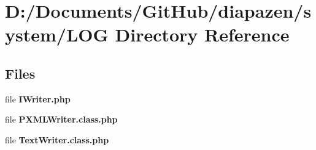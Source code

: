 \section{D\-:/\-Documents/\-Git\-Hub/diapazen/system/\-L\-O\-G Directory Reference}
\label{dir_ee23715ad510c14b853b8a9ea1ace839}
\subsection*{Files}
\begin{DoxyCompactItemize}
\item 
file {\bfseries I\-Writer.\-php}
\item 
file {\bfseries P\-X\-M\-L\-Writer.\-class.\-php}
\item 
file {\bfseries Text\-Writer.\-class.\-php}
\end{DoxyCompactItemize}
